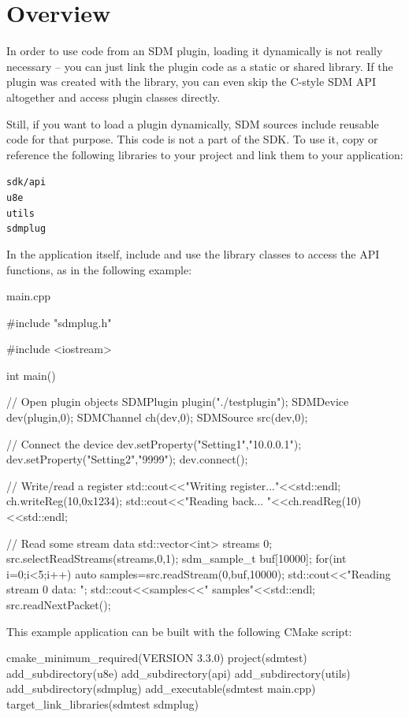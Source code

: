 \documentclass[a4paper,12pt,twoside,extrafontsizes]{memoir}
\begin{document}
\section{Overview}

In order to use code from an SDM plugin, loading it dynamically is not really necessary -- you can just link the plugin code as a static or shared library. If the plugin was created with the  library, you can even skip the C-style SDM API altogether and access plugin classes directly.

Still, if you want to load a plugin dynamically, SDM sources include reusable code for that purpose. This code is not a part of the SDK. To use it, copy or reference the following libraries to your project and link them to your application:

\begin{alltt}
    sdk/api
    u8e
    utils
    sdmplug
\end{alltt}

In the application itself, include  and use the library classes to access the API functions, as in the following example:

\begin{breakshellcmdsnamed}{main.cpp}\begin{ccode}
#include "sdmplug.h"

#include <iostream>

int main() {
// Open plugin objects
	SDMPlugin plugin("./testplugin");
	SDMDevice dev(plugin,0);
	SDMChannel ch(dev,0);
	SDMSource src(dev,0);
	
// Connect the device
	dev.setProperty("Setting1","10.0.0.1");
	dev.setProperty("Setting2","9999");
	dev.connect();
	
// Write/read a register
	std::cout<<"Writing register..."<<std::endl;
	ch.writeReg(10,0x1234);
	std::cout<<"Reading back... "<<ch.readReg(10)<<std::endl;
	
// Read some stream data
	std::vector<int> streams {0};
	src.selectReadStreams(streams,0,1);
	sdm_sample_t buf[10000];
	for(int i=0;i<5;i++) {
		auto samples=src.readStream(0,buf,10000);
		std::cout<<"Reading stream 0 data: ";
		std::cout<<samples<<" samples"<<std::endl;
		src.readNextPacket();
	}
}
\end{ccode}\end{breakshellcmdsnamed}

This example application can be built with the following CMake script:

\begin{shellcmds}
cmake\_minimum\_required(VERSION 3.3.0)
project(sdmtest)
add\_subdirectory(u8e)
add\_subdirectory(api)
add\_subdirectory(utils)
add\_subdirectory(sdmplug)
add\_executable(sdmtest main.cpp)
target\_link\_libraries(sdmtest sdmplug)
\end{shellcmds}
\end{document}
